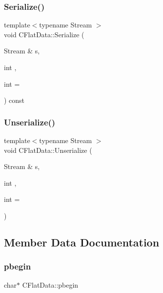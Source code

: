 \mbox{\label{class_c_flat_data_a97449211175d7fbbb88830cbba808132}} 
\subsubsection{\texorpdfstring{Serialize()}{Serialize()}}
{\footnotesize\ttfamily template$<$typename Stream $>$ \\
void C\+Flat\+Data\+::\+Serialize (\begin{DoxyParamCaption}\item[{Stream \&}]{s,  }\item[{int}]{,  }\item[{int}]{ = {} }\end{DoxyParamCaption}) const\hspace{0.3cm}{\ttfamily [inline]}}

\mbox{\label{class_c_flat_data_a3da79327bf2937113de502182ee227b9}} 
\subsubsection{\texorpdfstring{Unserialize()}{Unserialize()}}
{\footnotesize\ttfamily template$<$typename Stream $>$ \\
void C\+Flat\+Data\+::\+Unserialize (\begin{DoxyParamCaption}\item[{Stream \&}]{s,  }\item[{int}]{,  }\item[{int}]{ = {} }\end{DoxyParamCaption})\hspace{0.3cm}{\ttfamily [inline]}}



\subsection{Member Data Documentation}
\mbox{\label{class_c_flat_data_ad5f93a9d4e1cc71eb5fc94e9c9d4d89d}} 
\subsubsection{\texorpdfstring{pbegin}{pbegin}}
{\footnotesize\ttfamily char$\ast$ C\+Flat\+Data\+::pbegin\hspace{0.3cm}{\ttfamily [protected]}}

